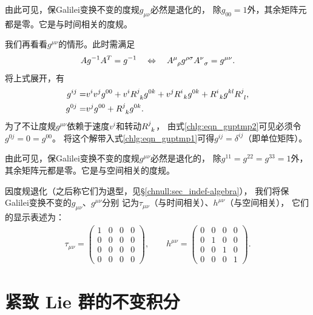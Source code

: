 由此可见，保Galilei变换不变的度规$g_{\mu\nu}$必然是退化的，
除$g_{00}=1$外，其余矩阵元都是零。它是与时间相关的度规。

我们再看看$g^{\mu\nu}$的情形。此时需满足
\begin{equation}
	A g^{-1} A^T = g^{-1} \quad \Leftrightarrow \quad
	A^{\mu}_{\hphantom{\mu}\rho} g^{\rho\sigma} A^{\nu}_{\hphantom{\mu}\sigma} = g^{\mu\nu}.
\end{equation}
将上式展开，有
\begin{align}
    g^{i j}= & v^i v^j g^{00}+ v^{i} R^{j}_{\hphantom{j}k } g^{0 k} + v^{j} R^{i}_{\hphantom{j} k} g^{0 k}  
     +R^i_{\hphantom{j}k} g^{kl} R^j_{\hphantom{j}l} , \label{chlg:eqn_guptmp1} \\
	g^{0 j}= & v^j g^{00}+R^j_{\hphantom{j}k} g^{0 k} . \label{chlg:eqn_guptmp2}  
\end{align}
为了不让度规$g^{\mu\nu}$依赖于速度$v^i$和转动$R^j_{\hphantom{j}k}$，
由式\eqref{chlg:eqn_guptmp2}可见必须令$g^{0j}=0=g^{00}$。
将这个解带入式\eqref{chlg:eqn_guptmp1}可得$g^{ij}=\delta^{ij}$（即单位矩阵）。

由此可见，保Galilei变换不变的度规$g^{\mu\nu}$必然是退化的，
除$g^{11}=g^{22}=g^{33}=1$外，其余矩阵元都是零。它是与空间相关的度规。

因度规退化（之后称它们为{\kaishu 退型}，见\S\ref{chnull:sec_indef-algebra}），
我们将保Galilei变换不变的$g_{\mu\nu}$、$g^{\mu\nu}$分别
记为$\tau_{\mu\nu}$（与时间相关）、$h^{\mu\nu}$（与空间相关），
它们的显示表述为：
\begin{align}
\tau_{\mu \nu}=\left(\begin{array}{cccc}
	1 & 0 & 0 & 0 \\
	0 & 0 & 0 & 0 \\
	0 & 0 & 0 & 0 \\
	0 & 0 & 0 & 0
\end{array}\right), \qquad 
h^{\mu \nu}=\left(\begin{array}{cccc}
	0 & 0 & 0 & 0 \\
	0 & 1 & 0 & 0 \\
	0 & 0 & 1 & 0 \\
	0 & 0 & 0 & 1
\end{array}\right) .	
\end{align}



\section{紧致 Lie 群的不变积分}\label{chlg:sec_Integral}

